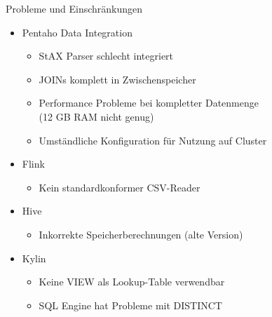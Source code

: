 \documentclass[12pt, utf8, ngerman, notes]{beamer}
\begin{document}
\begin{frame}{Probleme und Einschränkungen}
	\begin{itemize}
        \item Pentaho Data Integration
        \begin{itemize}
            \item StAX Parser schlecht integriert
            \item JOINs komplett in Zwischenspeicher
            \item Performance Probleme bei kompletter Datenmenge \\
            (12 GB RAM nicht genug)
            \item Umständliche Konfiguration für Nutzung auf Cluster
        \end{itemize}
        \item Flink
        \begin{itemize}
			\item Kein standardkonformer CSV-Reader
        \end{itemize}
        \item Hive
        \begin{itemize}
            \item Inkorrekte Speicherberechnungen (alte Version)
        \end{itemize}
        \item Kylin
        \begin{itemize}
			\item Keine VIEW als Lookup-Table verwendbar
            \item SQL Engine hat Probleme mit DISTINCT
		\end{itemize}
    \end{itemize}
\end{frame}
\end{document}
